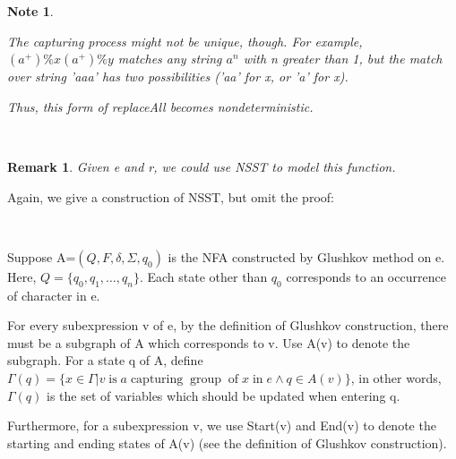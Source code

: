 \documentclass[sigplan,review,anonymous]{acmart}\settopmatter{printfolios=true,printccs=false,printacmref=false}
\newcommand{\tmop}[1]{\ensuremath{\operatorname{#1}}}
\newtheorem{note}{Note}
\newtheorem{remark}{Remark}
\begin{document}
\begin{note}
  \
  
  The capturing process might not be unique, though. For example, $(a^+) \%x
  (a^+) \%y$ matches any string $a^n$ with n greater than 1, but the match
  over string 'aaa' has two possibilities ('aa' for x, or 'a' for x).
  
  Thus, this form of replaceAll becomes nondeterministic.
\end{note}

\

\begin{remark}
  Given e and r, we could use NSST to model this function.
\end{remark}

Again, we give a construction of NSST, but omit the proof:

\

Suppose A=$(Q, F, \delta, \Sigma, q_0)$ is the NFA constructed by Glushkov
method on e. Here, $Q = \{ q_0, q_1, \ldots, q_n \}$. Each state other than
$q_0$ corresponds to an occurrence of character in e.

For every subexpression v of e, by the definition of Glushkov construction,
there must be a subgraph of A which corresponds to v. Use A(v) to denote the
subgraph. For a state q of A, define $\Gamma (q) = \{ x \in \Gamma |v
\tmop{is} a \tmop{capturing} \tmop{group} \tmop{of} x \tmop{in} e \wedge q \in
A (v) \}$, in other words, $\Gamma (q)$ is the set of variables which should
be updated when entering q.

Furthermore, for a subexpression v, we use Start(v) and End(v) to denote the
starting and ending states of A(v) (see the definition of Glushkov
construction).

\
\end{document}
